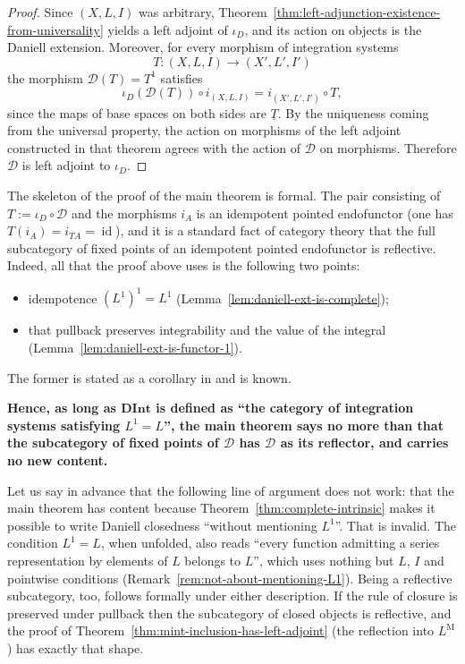 \begin{proof}
  Since $(X,L,I)$ was arbitrary,
  Theorem~\ref{thm:left-adjunction-existence-from-universality} yields a left
  adjoint of $\iota_{D}$, and its action on objects is the Daniell extension.
  Moreover, for every morphism of integration systems
  \[
    T:(X,L,I)\to(X',L',I')
  \]
  the morphism $\mathcal{D}(T)=T^1$ satisfies
  \[
    \iota_{D}(\mathcal{D}(T))\circ i_{(X,L,I)}
    =i_{(X',L',I')}\circ T ,
  \]
  since the maps of base spaces on both sides are $\underline{T}$.
  By the uniqueness coming from the universal property, the action on morphisms
  of the left adjoint constructed in that theorem agrees with the action of
  $\mathcal{D}$ on morphisms. Therefore $\mathcal{D}$ is left adjoint to
  $\iota_{D}$.
\end{proof}



\begin{remark}\label{rem:main-theorem-not-tautology}
  The skeleton of the proof of the main theorem is formal.
  The pair consisting of $T:=\iota_{D}\circ\mathcal{D}$ and the morphisms $i_A$
  is an idempotent pointed endofunctor
  (one has $T(i_A)=i_{TA}=\operatorname{id}$), and it is a standard fact of
  category theory that the full subcategory of fixed points of an idempotent
  pointed endofunctor is reflective.
  Indeed, all that the proof above uses is the following two points:
  \begin{itemize}
    \item idempotence $(L^1)^1=L^1$
      (Lemma~\ref{lem:daniell-ext-is-complete});
    \item that pullback preserves integrability and the value of the integral
      (Lemma~\ref{lem:daniell-ext-is-functor-1}).
  \end{itemize}
  The former is stated as a corollary in \cite{Yamagami} and is known.

  \textbf{Hence, as long as $\mathbf{DInt}$ is defined as ``the category of
  integration systems satisfying $L^1=L$'', the main theorem says no more than
  that the subcategory of fixed points of $\mathcal{D}$ has $\mathcal{D}$ as its
  reflector, and carries no new content.}

  Let us say in advance that the following line of argument does not work: that
  the main theorem has content because
  Theorem~\ref{thm:complete-intrinsic} makes it possible to write Daniell
  closedness ``without mentioning $L^1$''.
  That is invalid. The condition $L^1=L$, when unfolded, also reads ``every
  function admitting a series representation by elements of $L$ belongs to
  $L$'', which uses nothing but $L$, $I$ and pointwise conditions
  (Remark~\ref{rem:not-about-mentioning-L1}).
  Being a reflective subcategory, too, follows formally under either
  description.
  If the rule of closure is preserved under pullback then the subcategory of
  closed objects is reflective, and the proof of
  Theorem~\ref{thm:mint-inclusion-has-left-adjoint} (the reflection into
  $L^{\mathrm{M}}$) has exactly that shape.


\end{remark}
